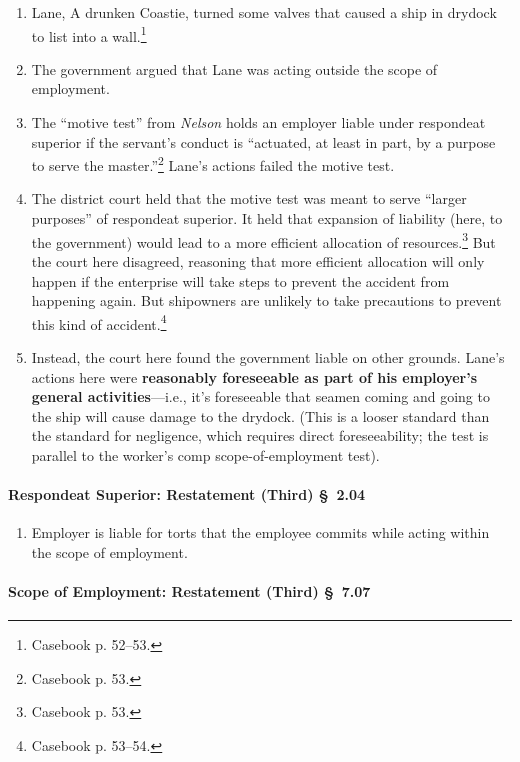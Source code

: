 \begin{enumerate}
    \item Lane, A drunken Coastie, turned some valves that caused a ship in 
    drydock to list into a wall.\footnote{Casebook p. 52--53.}
    \item The government argued that Lane was acting outside the scope of 
    employment.
    \item The ``motive test'' from \emph{Nelson} holds an employer liable 
    under respondeat superior if the servant's conduct is ``actuated, at least 
    in part, by a purpose to serve the master.''\footnote{Casebook p. 53.} 
    Lane's actions failed the motive test.
    \item The district court held that the motive test was meant to serve 
    ``larger purposes'' of respondeat superior. It held that expansion of 
    liability (here, to the government) would lead to a more efficient 
    allocation of resources.\footnote{Casebook p. 53.} But the court here 
    disagreed, reasoning that more efficient allocation will only happen if 
    the enterprise will take steps to prevent the accident from happening 
    again. But shipowners are unlikely to take precautions to prevent this 
    kind of accident.\footnote{Casebook p. 53--54.}
    \item Instead, the court here found the government liable on other 
    grounds. Lane's actions here were \textbf{reasonably foreseeable as part of his 
    employer's general activities}---i.e., it's foreseeable that seamen coming 
    and going to the ship will cause damage to the drydock. (This is a looser 
    standard than the standard for negligence, which requires direct 
    foreseeability; the test is parallel to the worker's comp 
    scope-of-employment test).
\end{enumerate}

\paragraph{Respondeat Superior: Restatement (Third) \S\ 2.04}

\begin{enumerate}
    \item Employer is liable for torts that the employee commits while acting 
    within the scope of employment.
\end{enumerate}

\paragraph{Scope of Employment: Restatement (Third) \S\ 7.07}

